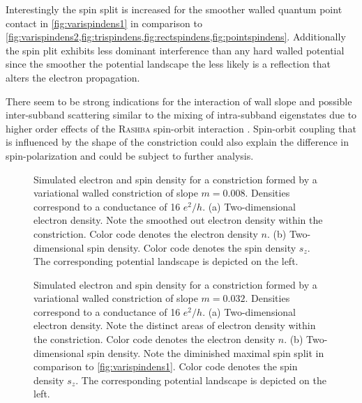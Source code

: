 Interestingly the spin split is increased for the smoother walled quantum point contact in \cref{fig:varispindens1} in comparison to \cref{fig:varispindens2,fig:trispindens,fig:rectspindens,fig:pointspindens}. Additionally the spin plit exhibits less dominant interference than any hard walled potential since the smoother the potential landscape the less likely is a reflection that alters the electron propagation.\par
There seem to be strong indications for the interaction of wall slope and possible inter-subband scattering similar to the mixing of intra-subband eigenstates due to higher order effects of the \textsc{Rashba} spin-orbit interaction \cite{Wolfgang2003PhysicaE.18.337}. Spin-orbit coupling that is influenced by the shape of the constriction could also explain the difference in spin-polarization and could be subject to further analysis.
\begin{figure}[h]
\caption{Simulated electron and spin density for a constriction formed by a variational walled constriction of slope $m=0.008$. Densities correspond to a conductance of 16 $e^2/h$. (a) Two-dimensional electron density. Note the smoothed out electron density within the constriction. Color code denotes the electron density $n$. (b) Two-dimensional spin density. Color code denotes the spin density $s_z$. The corresponding potential landscape is depicted on the left.}
\end{figure}
\begin{figure}[h]
\caption{Simulated electron and spin density for a constriction formed by a variational walled constriction of slope $m=0.032$. Densities correspond to a conductance of 16 $e^2/h$. (a) Two-dimensional electron density. Note the distinct areas of electron density within the constriction. Color code denotes the electron density $n$. (b) Two-dimensional spin density. Note the diminished maximal spin split in comparison to \cref{fig:varispindens1}. Color code denotes the spin density $s_z$. The corresponding potential landscape is depicted on the left.}
\end{figure}
\FloatBarrier
